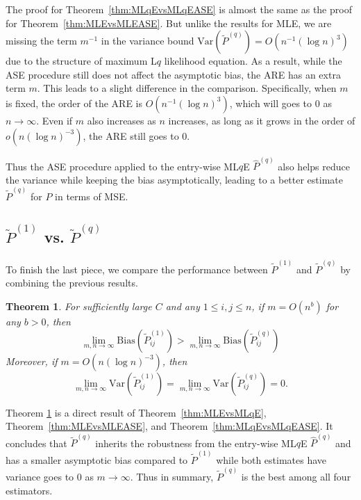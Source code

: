 \documentclass[a4paper]{article}
\newtheorem{theorem}[fact]{Theorem}
\newtheorem{remark}[fact]{Remark}
\renewcommand{\hat}{\widehat}
\begin{document}
The proof for Theorem~\ref{thm:MLqEvsMLqEASE} is almost the same as the proof for Theorem~\ref{thm:MLEvsMLEASE}. But unlike the results for MLE, we are missing the term $m^{-1}$ in the variance bound $\mathrm{Var}(\widetilde{P}^{(q)}) = O(n^{-1} (\log n)^3)$ due to the structure of maximum L$q$ likelihood equation. As a result, while the ASE procedure still does not affect the asymptotic bias, the ARE has an extra term $m$. This leads to a slight difference in the comparison. Specifically, when $m$ is fixed, the order of the ARE is $O(n^{-1} (\log n)^3)$, which will goes to 0 as $n \to \infty$. Even if $m$ also increases as $n$ increases, as long as it grows in the order of $o(n (\log n)^{-3})$, the ARE still goes to 0. 

Thus the ASE procedure applied to the entry-wise ML$q$E $\hat{P}^{(q)}$ also helps reduce the variance while keeping the bias asymptotically, leading to a better estimate $\widetilde{P}^{(q)}$ for $P$ in terms of MSE.


\subsection{$\widetilde{P}^{(1)}$ vs. $\widetilde{P}^{(q)}$}

To finish the last piece, we compare the performance between $\widetilde{P}^{(1)}$ and $\widetilde{P}^{(q)}$ by combining the previous results.

\begin{theorem}
\label{thm:MLEASEvsMLqEASE}
For sufficiently large $C$ and any $1 \le i,j \le n$, if $m = O(n^b)$ for any $b > 0$, then
\[
	\lim_{m, n \to \infty} \mathrm{Bias}(\widetilde{P}_{ij}^{(1)})
    > \lim_{m, n \to \infty} \mathrm{Bias}(\widetilde{P}_{ij}^{(q)})
\]
Moreover, if $m = O(n (\log n)^{-3})$, then
\[
	\lim_{m, n \to \infty} \mathrm{Var}(\widetilde{P}_{ij}^{(1)})
    = \lim_{m, n \to \infty} \mathrm{Var}(\widetilde{P}_{ij}^{(q)}) = 0.
\]
\end{theorem}

Theorem \ref{thm:MLEASEvsMLqEASE} is a direct result of Theorem~\ref{thm:MLEvsMLqE}, Theorem~\ref{thm:MLEvsMLEASE}, and Theorem~\ref{thm:MLqEvsMLqEASE}.
It concludes that $\widetilde{P}^{(q)}$ inherits the robustness from the entry-wise ML$q$E $\hat{P}^{(q)}$ and has a smaller asymptotic bias compared to $\widetilde{P}^{(1)}$ while both estimates have variance goes to 0 as $m \to \infty$. Thus in summary, $\widetilde{P}^{(q)}$ is the best among all four estimators.
\end{document}

